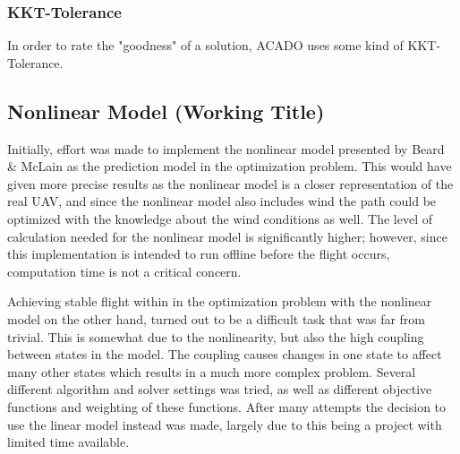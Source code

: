 \subsubsection{KKT-Tolerance}

In order to rate the "goodness" of a solution, ACADO uses some kind of KKT-Tolerance.


\subsection{Nonlinear Model (Working Title)}

Initially, effort was made to implement the nonlinear model presented by Beard \& McLain \cite{uavBEARD} as the prediction model in the optimization problem. This would have given more precise results as the nonlinear model is a closer representation of the real UAV, and since the nonlinear model also includes wind the path could be optimized with the knowledge about the wind conditions as well. The level of calculation needed for the nonlinear model is significantly higher; however, since this implementation is intended to run offline before the flight occurs, computation time is not a critical concern.

Achieving stable flight within in the optimization problem with the nonlinear model on the other hand, turned out to be a difficult task that was far from trivial. This is somewhat due to the nonlinearity, but also the high coupling between states in the model. The coupling causes changes in one state to affect many other states which results in a much more complex problem. Several different algorithm and solver settings was tried, as well as different objective functions and weighting of these functions. After many attempts the decision to use the linear model instead was made, largely due to this being a project with limited time available.
